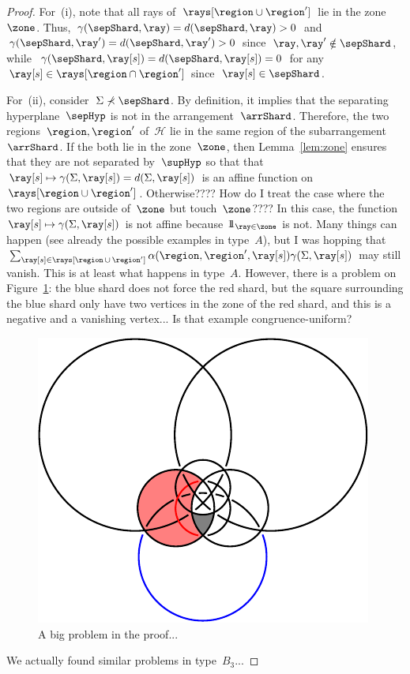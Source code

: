 \documentclass{amsart}
\theoremstyle{definition}
\newcommand{\one}{{1\!\!1}} %
\newcommand{\fref}[1]{Figure~\ref{#1}} %
\newcommand{\vincent}[1]{\todo[color=blue!30]{#1 \\ \hfill --- V.}}
\newcommand{\arrangement}{\mathcal{H}} %
\newcommand{\shard}{\Sigma}
\newcommand{\contribution}{\gamma} %
\newcommand{\coefficient}{\alpha} %
\newcommand{\distance}[2]{d(#2,#1)} %
\begin{document}
\begin{proof}
For~(i), note that all rays of~$\rays[\region \cup \region']$ lie in the zone~$\zone$.
Thus, ${\contribution(\sepShard, \ray) = \distance{\ray}{\sepShard} > 0}$ and ${\contribution(\sepShard, \ray') = \distance{\ray'}{\sepShard} > 0}$ since~$\ray, \ray' \notin \sepShard$, while~$\contribution(\sepShard, \ray[s]) = \distance{\ray[s]}{\sepShard} = 0$ for any ${\ray[s] \in \rays[\region \cap \region']}$ since~$\ray[s] \in \sepShard$.

For~(ii), consider~$\shard \not\prec \sepShard$.
By definition, it implies that the separating hyperplane~$\sepHyp$ is not in the arrangement~$\arrShard$.
Therefore, the two regions~$\region, \region'$ of~$\arrangement$ lie in the same region of the subarrangement~$\arrShard$.
If the both lie in the zone~$\zone$, then Lemma~\ref{lem:zone} ensures that they are not separated by~$\supHyp$ so that that~$\ray[s] \mapsto \contribution(\shard, \ray[s]) = \distance{\ray[s]}{\shard}$ is an affine function on~$\rays[\region \cup \region']$.
Otherwise????\vincent{Major problem here}
How do I treat the case where the two regions are outside of~$\zone$ but touch~$\zone$????
In this case, the function~$\ray[s] \mapsto \contribution(\shard, \ray[s])$ is not affine because $\one_{\ray \in \zone}$ is not.
Many things can happen (see already the possible examples in type~$A$), but I was hopping that~$\sum_{\ray[s] \in \rays[\region \,\cup\, \region']} \coefficient(\region, \region', \ray[s]) \contribution(\shard, \ray[s])$ may still vanish.
This is at least what happens in type~$A$.
However, there is a problem on \fref{fig:problemVanish}: the blue shard does not force the red shard, but the square surrounding the blue shard only have two vertices in the zone of the red shard, and this is a negative and a vanishing vertex... Is that example congruence-uniform?
%
\begin{figure}[h]
	\capstart
	\centerline{\includegraphics[scale=1]{probleme4}}
	\caption{A big problem in the proof...}
	\label{fig:problemVanish}
\end{figure}
We actually found similar problems in type~$B_3$...
\end{proof}
\end{document}
